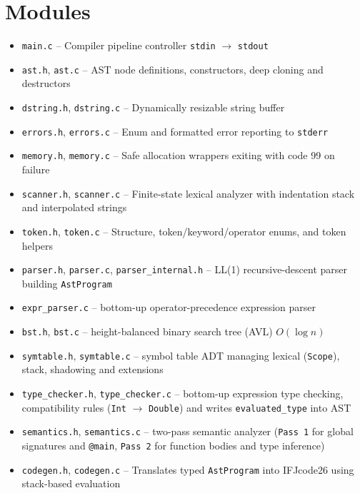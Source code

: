 \documentclass[a4paper]{article}
\begin{document}
\section{Modules}

\begin{itemize}[leftmargin=1.5em]
  \item \texttt{main.c} -- Compiler pipeline controller \texttt{stdin} $\to$ \texttt{stdout}
  \item \texttt{ast.h}, \texttt{ast.c} -- AST node definitions, constructors, deep cloning and destructors
  \item \texttt{dstring.h}, \texttt{dstring.c} -- Dynamically resizable string buffer
  \item \texttt{errors.h}, \texttt{errors.c} -- Enum and formatted error reporting to \texttt{stderr}
  \item \texttt{memory.h}, \texttt{memory.c} -- Safe allocation wrappers exiting with code 99 on failure
  \item \texttt{scanner.h}, \texttt{scanner.c} -- Finite-state lexical analyzer with indentation stack and interpolated strings
  \item \texttt{token.h}, \texttt{token.c} -- Structure, token/keyword/operator enums, and token helpers
  \item \texttt{parser.h}, \texttt{parser.c}, \texttt{parser\_internal.h} -- LL(1) recursive-descent parser building \texttt{AstProgram}
  \item \texttt{expr\_parser.c} -- bottom-up operator-precedence expression parser 
  \item \texttt{bst.h}, \texttt{bst.c} -- height-balanced binary search tree (AVL) $O(\log n)$
  \item \texttt{symtable.h}, \texttt{symtable.c} -- symbol table ADT managing lexical (\texttt{Scope}), stack, shadowing and extensions
  \item \texttt{type\_checker.h}, \texttt{type\_checker.c} -- bottom-up expression type checking, compatibility rules (\texttt{Int} $\to$ \texttt{Double}) and writes \texttt{evaluated\_type} into AST
  \item \texttt{semantics.h}, \texttt{semantics.c} -- two-pass semantic analyzer (\texttt{Pass 1} for global signatures and \texttt{@main}, \texttt{Pass 2} for function bodies and type inference)
  \item \texttt{codegen.h}, \texttt{codegen.c} -- Translates typed \texttt{AstProgram} into IFJcode26 using stack-based evaluation
\end{itemize}
\end{document}
